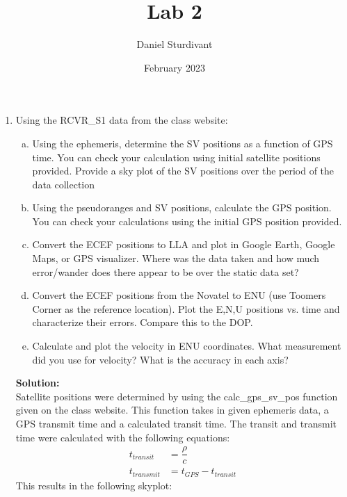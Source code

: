 \documentclass[11pt]{article}
\author{Daniel Sturdivant}
\title{Lab 2}
\date{February 2023}
\newcommand{\solution}{\textbf{Solution: \\}}
\begin{document}
\maketitle
\thispagestyle{fancy}
\setlength{\parindent}{0pt}

\begin{enumerate}[label=\textbf{\arabic*.}]
  \itemsep 24pt
  \item Using the RCVR\_S1 data from the class website: 
  \begin{enumerate}[(a)]
    \itemsep -2pt 
    \item Using the ephemeris, determine the SV positions as a function of GPS time. You can
    check your calculation using initial satellite positions provided. Provide a sky plot of the
    SV positions over the period of the data collection
    \item Using the pseudoranges and SV positions, calculate the GPS position. You can check
    your calculations using the initial GPS position provided.
    \item Convert the ECEF positions to LLA and plot in Google Earth, Google Maps, or GPS
    visualizer. Where was the data taken and how much error/wander does there appear to
    be over the static data set?
    \item Convert the ECEF positions from the Novatel to ENU (use Toomers Corner as the
    reference location). Plot the E,N,U positions vs. time and characterize their errors.
    Compare this to the DOP.
    \item Calculate and plot the velocity in ENU coordinates. What measurement did you use for
    velocity? What is the accuracy in each axis?
  \end{enumerate}
  \solution
  Satellite positions were determined by using the calc\_gps\_sv\_pos function 
  given on the class website. This function takes in given ephemeris data, a GPS 
  transmit time and a calculated transit time. The transit and transmit time were 
  calculated with the following equations:
  \begin{equation*}
    \begin{split}
      t_{transit} &= \dfrac{\rho}{c} \\
      t_{transmit} &= t_{GPS} - t_{transit}
    \end{split}
  \end{equation*}
  This results in the following skyplot:
  \begin{figure}[H]

\end{figure}
\end{enumerate}
\end{document}
